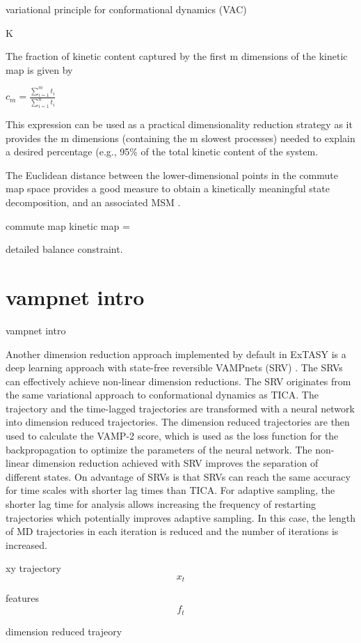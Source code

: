 variational principle for conformational dynamics (VAC)


K

The fraction of kinetic content captured by the first m dimensions of the kinetic map is given by \cite{noe2016commute}

$c_{m}=\frac{\sum_{i=1}^{m}t_{i}}{\sum_{i=1}^{n}t_{i}}$

This expression can be used as a practical dimensionality reduction strategy as it provides the m dimensions (containing the m slowest processes) needed to explain a desired percentage (e.g., 95\% of the total kinetic content of the system.

The Euclidean distance between the
lower-dimensional points in the commute map space provides a good measure to
obtain a kinetically meaningful state decomposition, and an associated MSM
\cite{noe2016commute}.

commute map
kinetic map =

detailed balance
constraint. 
\section{vampnet intro}
vampnet intro

Another dimension reduction approach implemented by default in ExTASY is a deep learning approach with state-free reversible VAMPnets (SRV) \cite{Mardt2018,chen2019jcp}. The SRVs can effectively achieve non-linear dimension reductions. The SRV originates from the same variational
approach to conformational dynamics as TICA. The trajectory and the time-lagged trajectories are transformed with a neural network into dimension reduced trajectories. The dimension reduced trajectories are then used to calculate the VAMP-2 score, which is used as the loss function for the backpropagation to optimize the parameters of the neural network. The non-linear dimension reduction achieved with SRV improves the separation of different states. On advantage of SRVs is that SRVs can reach the same accuracy for time scales with shorter lag times than TICA. For adaptive sampling, the shorter lag time for analysis allows increasing the frequency of restarting trajectories which potentially improves adaptive sampling. In this case, the length of MD trajectories in each iteration is reduced and the number of iterations is increased.

xy trajectory
$$x_{t}$$

features
$$f_{t}$$

dimension reduced trajeory

